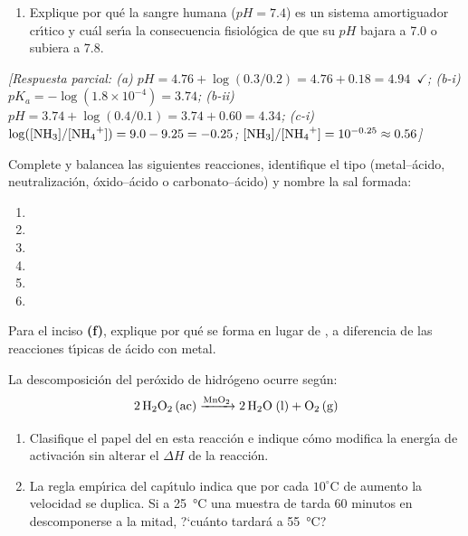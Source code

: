 \begin{bloque_ejercicios}
\begin{ejercicios}
\begin{enumerate}[label=\alph*)]
    \item Explique por qu\'e la sangre humana ($pH = 7.4$) es un
          sistema amortiguador cr\'{\i}tico y cu\'al ser\'{\i}a la
          consecuencia fisiológica de que su $pH$ bajara a 7.0
          o subiera a 7.8.
\end{enumerate}

\textit{[Respuesta parcial:
(a) $pH = 4.76 + \log(0.3/0.2) = 4.76 + 0.18 = 4.94$~$\checkmark$;
(b-i) $pK_a = -\log(1.8\times10^{-4}) = 3.74$;
(b-ii) $pH = 3.74 + \log(0.4/0.1) = 3.74 + 0.60 = 4.34$;
(c-i) $\log([\ce{NH3}]/[\ce{NH4+}]) = 9.0 - 9.25 = -0.25$;
      $[\ce{NH3}]/[\ce{NH4+}] = 10^{-0.25} \approx 0.56$]}

\item Complete y balancea las siguientes reacciones, identifique el
tipo (metal--\'acido, neutralizaci\'on, \'oxido--\'acido o
carbonato--\'acido) y nombre la sal formada:

\begin{enumerate}[label=\alph*)]
    \item {}
    \item {}
    \item {}
    \item {}
    \item {}
    \item {}
\end{enumerate}

Para el inciso \textbf{(f)}, explique por qu\'e se forma 
en lugar de , a diferencia de las reacciones t\'{\i}picas
de \'acido con metal.

\item La descomposici\'on del per\'oxido de hidr\'ogeno ocurre seg\'un:
\[
    \ce{2H2O2 (ac) ->[\ce{MnO2}] 2H2O (l) + O2 (g)}
\]

\begin{enumerate}[label=\alph*)]
    \item Clasifique el papel del  en esta reacci\'on
          e indique c\'omo modifica la energ\'{\i}a de activaci\'on
          sin alterar el $\Delta H$ de la reacci\'on.

    \item La regla emp\'{\i}rica del cap\'{\i}tulo indica que por cada
          $10^\circ$C de aumento la velocidad se duplica.
          Si a \SI{25}{\celsius} una muestra de 
          tarda 60 minutos en descomponerse a la mitad,
          ?`cu\'anto tardar\'a a \SI{55}{\celsius}?


\end{enumerate}
\end{ejercicios}
\end{bloque_ejercicios}
